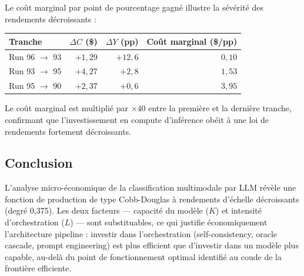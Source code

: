 Le coût marginal par point de pourcentage gagné illustre la sévérité des rendements décroissants :

\begin{center}
\begin{tabular}{lrrr}
\toprule
Tranche & $\Delta C$ (\$) & $\Delta Y$ (pp) & Coût marginal (\$/pp) \\
\midrule
Run 96 $\to$ 93 & $+1{,}29$ & $+12{,}6$ & $0{,}10$ \\
Run 93 $\to$ 95 & $+4{,}27$ & $+2{,}8$ & $1{,}53$ \\
Run 95 $\to$ 90 & $+2{,}37$ & $+0{,}6$ & $3{,}95$ \\
\bottomrule
\end{tabular}
\end{center}

Le coût marginal est multiplié par $\times 40$ entre la première et la dernière tranche, confirmant que l'investissement en compute d'inférence obéit à une loi de rendements fortement décroissants.

\subsection{Conclusion}

L'analyse micro-économique de la classification multimodale par LLM révèle une fonction de production de type Cobb-Douglas à rendements d'échelle décroissants (degré 0,375). Les deux facteurs --- capacité du modèle ($K$) et intensité d'orchestration ($L$) --- sont substituables, ce qui justifie économiquement l'architecture pipeline : investir dans l'orchestration (self-consistency, oracle cascade, prompt engineering) est plus efficient que d'investir dans un modèle plus capable, au-delà du point de fonctionnement optimal identifié au coude de la frontière efficiente.

